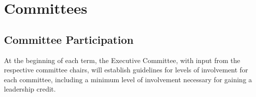 




\chapter{Committees}\label{sec:committees}
\section{Committee Participation}\label{sec:commPart}
At the beginning of each term, the Executive Committee, with input from the respective committee chairs, will establish guidelines for levels of involvement for each committee, including a minimum level of involvement necessary for gaining a leadership credit.

